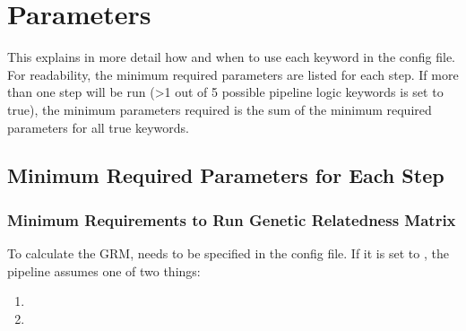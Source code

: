 \documentclass[letterpaper,10pt,english]{sphinxmanual}
\begin{document}
\begin{sphinxVerbatim}[commandchars=\\\{\}]
\end{sphinxVerbatim}


\section{Parameters}
\label{\detokenize{parameters:parameters}}\label{\detokenize{parameters::doc}}
This explains in more detail how and when to use each keyword in the config file.  For readability, the minimum required parameters are listed for each step.  If more than one step will be run (\textgreater{}1 out of 5 possible pipeline logic keywords is set to true), the minimum parameters required is the sum of the minimum required parameters for all true keywords.


\subsection{Minimum Required Parameters for Each Step}
\label{\detokenize{parameters:minimum-required-parameters-for-each-step}}

\subsubsection{Minimum Requirements to Run Genetic Relatedness Matrix}
\label{\detokenize{grmParameters:minimum-requirements-to-run-genetic-relatedness-matrix}}\label{\detokenize{grmParameters::doc}}
To calculate the GRM,  needs to be specified in the config file.  If it is set to , the pipeline assumes one of two things:
\begin{enumerate}
%
\item {} 

\item {} 

\end{enumerate}
\end{document}
